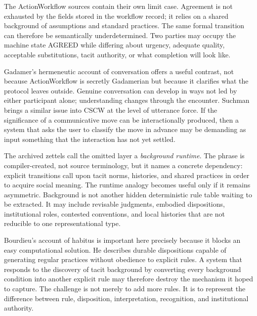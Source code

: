 \documentclass[11pt]{article}
\begin{document}
The ActionWorkflow sources contain their own limit case. Agreement is not exhausted by the fields stored in the workflow record; it relies on a shared background of assumptions and standard practices. The same formal transition can therefore be semantically underdetermined. Two parties may occupy the machine state AGREED while differing about urgency, adequate quality, acceptable substitutions, tacit authority, or what completion will look like. \cite{medinamora1992actionworkflow}\par

Gadamer's hermeneutic account of conversation offers a useful contrast, not because ActionWorkflow is secretly Gadamerian but because it clarifies what the protocol leaves outside. Genuine conversation can develop in ways not led by either participant alone; understanding changes through the encounter. Suchman brings a similar issue into CSCW at the level of utterance force. If the significance of a communicative move can be interactionally produced, then a system that asks the user to classify the move in advance may be demanding as input something that the interaction has not yet settled. \cite{suchman1993categories}\par

The archived zettels call the omitted layer a \emph{background runtime}. The phrase is compiler-created, not source terminology, but it names a concrete dependency: explicit transitions call upon tacit norms, histories, and shared practices in order to acquire social meaning. The runtime analogy becomes useful only if it remains asymmetric. Background is not another hidden deterministic rule table waiting to be extracted. It may include revisable judgments, embodied dispositions, institutional roles, contested conventions, and local histories that are not reducible to one representational type.\par

Bourdieu's account of habitus is important here precisely because it blocks an easy computational solution. He describes durable dispositions capable of generating regular practices without obedience to explicit rules. A system that responds to the discovery of tacit background by converting every background condition into another explicit rule may therefore destroy the mechanism it hoped to capture. The challenge is not merely to add more rules. It is to represent the difference between rule, disposition, interpretation, recognition, and institutional authority. \cite{bourdieu1977outline}\par
\end{document}

